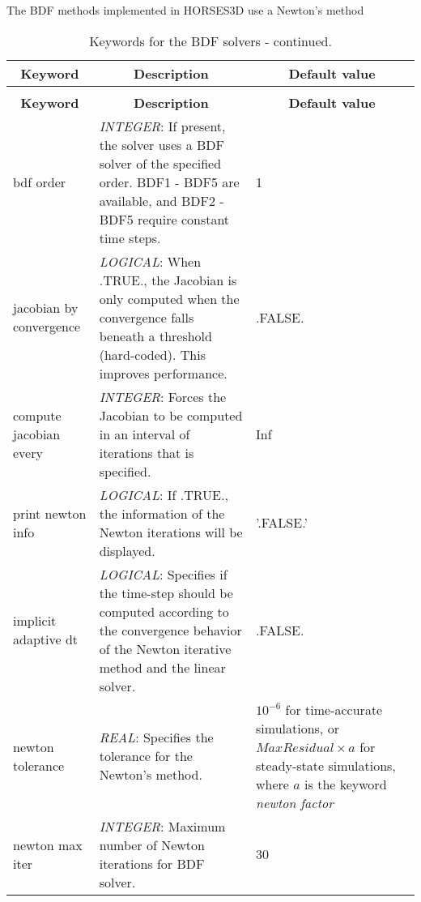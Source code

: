 \documentclass[a4paper,10pt]{report}
\begin{document}
The BDF methods implemented in HORSES3D use a Newton's method

\begin{longtable}{|p{4cm}|p{9cm}|p{3.2cm}|}
\caption{Keywords for the BDF solvers.} \label{tab:BDFkey} \\
\hline
\multicolumn{1}{|c|}{\textbf{Keyword}} & \multicolumn{1}{c|}{\textbf{Description}} & \multicolumn{1}{c|}{\textbf{Default value}} \\ \hline
\endfirsthead

\caption{Keywords for the BDF solvers - continued.} \\
\hline
\multicolumn{1}{|c|}{\textbf{Keyword}} & \multicolumn{1}{c|}{\textbf{Description}} & \multicolumn{1}{c|}{\textbf{Default value}} \\ \hline
\endhead

bdf order             & \textit{INTEGER}: If present, the solver uses a BDF solver of the specified order. BDF1 - BDF5 are available, and BDF2 - BDF5 require constant time steps. & 1 \\ \hline

jacobian by convergence & \textit{LOGICAL}: When .TRUE., the Jacobian is only computed when the convergence falls beneath a threshold (hard-coded). This improves performance.  & .FALSE. \\ \hline

compute jacobian every & \textit{INTEGER}: Forces the Jacobian to be computed in an interval of iterations that is specified. & Inf \\ \hline


print newton info       & \textit{LOGICAL}: If .TRUE., the information of the Newton iterations will be displayed. &  '.FALSE.'\\ \hline
implicit adaptive dt  & \textit{LOGICAL}: Specifies if the time-step should be computed according to the convergence behavior of the Newton iterative method and the linear solver. & .FALSE. \\ \hline

newton tolerance   & \textit{REAL}: Specifies the tolerance for the Newton's method. &  $10^{-6}$ for time-accurate simulations, or $MaxResidual \times a$ for steady-state simulations, where $a$ is the keyword \textit{newton factor} \\ \hline

newton max iter    & \textit{INTEGER}: Maximum number of Newton iterations for BDF solver.  & 30 \\ \hline


\end{longtable}
\end{document}
